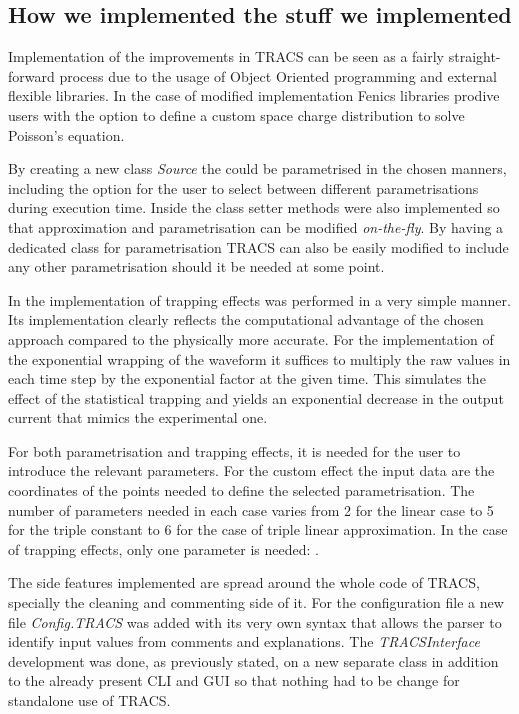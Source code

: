 \subsection{How we implemented the stuff we implemented}

Implementation of the improvements in TRACS can be seen as a fairly straight-forward process due to the usage of Object Oriented programming and external flexible libraries. In the case of modified \neff implementation Fenics libraries prodive users with the option to define a custom space charge distribution to solve Poisson's equation. 

By creating a new class \textit{Source} the \neff could be parametrised in the chosen manners, including the option for the user to select between different parametrisations during execution time. Inside the class setter methods were also implemented so that \neff approximation and parametrisation can be modified \textit{on-the-fly}. By having a dedicated class for \neff parametrisation TRACS can also be easily modified to include any other parametrisation should  it be needed at some point. 

In the implementation of trapping effects was performed in a very simple manner. Its implementation clearly reflects the computational advantage of the chosen approach compared to the physically more accurate. For the implementation of the exponential wrapping of the waveform it suffices to multiply the raw values in each time step by the exponential factor at the given time. This simulates the effect of the statistical trapping and yields an exponential decrease in the output current that mimics the experimental one.

For both \neff parametrisation and trapping effects, it is needed for the user to introduce the relevant parameters. For the custom \neff effect the input data are the coordinates of the points needed to define the selected \neff parametrisation. The number of parameters needed in each case varies from 2 for the linear case to 5 for the triple constant \neff to 6 for the case of triple linear approximation. In the case of trapping effects, only one parameter is needed: \tau.

The side features implemented are spread around the whole code of TRACS, specially the cleaning and commenting side of it. For the configuration file a new file \textit{Config.TRACS} was added with its very own syntax that allows the parser to identify input values from comments and explanations. The \textit{TRACSInterface} development was done, as previously stated, on a new separate class in addition to the already present CLI and GUI so that nothing had to be change for standalone use of TRACS.

